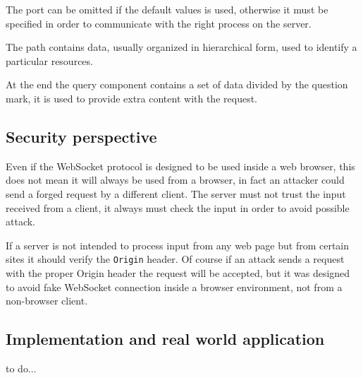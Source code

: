 The port can be omitted if the default values is used, otherwise it must be specified in order to communicate with the right process on the server.\newline

The path contains data, usually organized in hierarchical form, used to identify a particular resources.\newline

At the end the query component contains a set of data divided by the question mark, it is used to provide extra content with the request.\newline

\subsection{Security perspective}
Even if the WebSocket protocol is designed to be used inside a web browser, this does not mean it will always be used from a browser, in fact an attacker could send a forged request by a different client.\newline
The server must not trust the input received from a client, it always must check the input in order to avoid possible attack.\newline

If a server is not intended to process input from any web page but from certain sites it should verify the \texttt{Origin} header.\newline
Of course if an attack sends a request with the proper Origin header the request will be accepted, but it was designed to avoid fake WebSocket connection inside a browser environment, not from a non-browser client.\newline

\subsection{Implementation and real world application}
to do...
